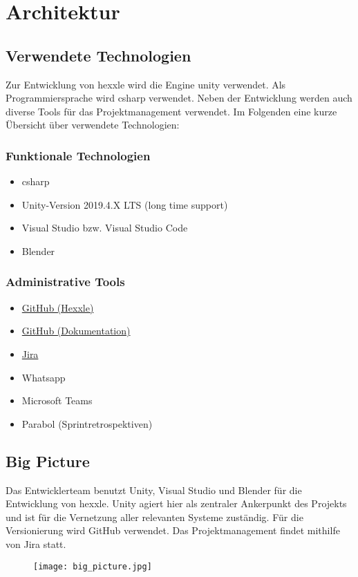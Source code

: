 \documentclass[../main.tex]{subfiles}
\begin{document}
	\section{Architektur}
	\subsection{Verwendete Technologien}
	\par Zur Entwicklung von \gls{hexxle} wird die Engine \gls{unity} verwendet. Als Programmiersprache wird \gls{csharp} verwendet. Neben der Entwicklung werden auch diverse Tools für das Projektmanagement verwendet. Im Folgenden eine kurze Übersicht über verwendete Technologien:

	\subsubsection{Funktionale Technologien}
	\begin{itemize}
		\item \gls{csharp}
		\item Unity-Version 2019.4.X LTS (long time support)
		\item Visual Studio bzw. Visual Studio Code
		\item Blender
	\end{itemize}
	\subsubsection{Administrative Tools}
	\begin{itemize}
		\item \href{https://github.com/hexxler/hexxle_game}{GitHub (Hexxle)}
		\item \href{https://github.com/hexxler/documentation}{GitHub (Dokumentation)}
		\item \href{https://hexxle.atlassian.net/jira/software/projects/HEXXLE/boards/1}{Jira}
		\item Whatsapp
		\item Microsoft Teams
		\item Parabol (Sprintretrospektiven)
	\end{itemize}

	\subsection{Big Picture}
	\par Das Entwicklerteam benutzt Unity, Visual Studio und Blender für die Entwicklung von \gls{hexxle}. Unity agiert hier als zentraler Ankerpunkt des Projekts und ist für die Vernetzung aller relevanten Systeme zuständig. Für die Versionierung wird GitHub verwendet. Das Projektmanagement findet mithilfe von Jira statt.
	\begin{figure}[H]
	\centering
	\texttt{[image: big\_picture.jpg]}
	\end{figure}
\end{document}
